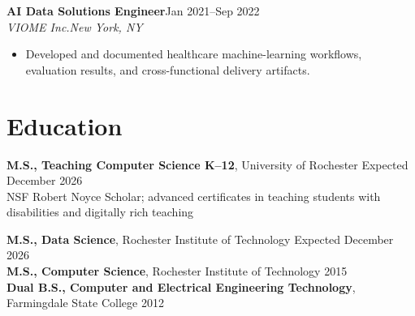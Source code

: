\documentclass[10pt,letterpaper]{article}
\newcommand{\role}[4]{\textbf{#1}\hfill #2\\\textit{#3}\hfill\textit{#4}\vspace{-3pt}}
\begin{document}
\role{AI Data Solutions Engineer}{Jan 2021--Sep 2022}{VIOME Inc.}{New York, NY}
\begin{itemize}
\item Developed and documented healthcare machine-learning workflows, evaluation
results, and cross-functional delivery artifacts.
\end{itemize}

\section*{Education}
\textbf{M.S., Teaching Computer Science K--12}, University of Rochester
\hfill Expected December 2026\\
NSF Robert Noyce Scholar; advanced certificates in teaching students with
disabilities and digitally rich teaching

\textbf{M.S., Data Science}, Rochester Institute of Technology
\hfill Expected December 2026\\
\textbf{M.S., Computer Science}, Rochester Institute of Technology \hfill 2015\\
\textbf{Dual B.S., Computer and Electrical Engineering Technology}, Farmingdale State College \hfill 2012
\end{document}
